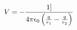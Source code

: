 \documentclass[preview]{standalone}
\begin{document}
\begin{align*}
V  =  - {1] \over {4 \pi\epsilon_0}  \left( \frac{q}{r_1} - \frac{q}{r_2} \right)}
\end{align*}
\end{document}

